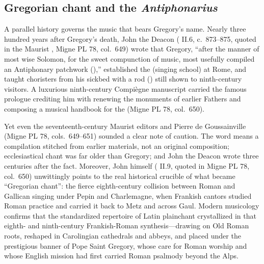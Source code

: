 \subsection{Gregorian chant and the \emph{Antiphonarius}}

A parallel history governs the music that bears Gregory's name. Nearly three
hundred years after Gregory's death, John the Deacon (
II.6, c.\ 873--875, quoted in the Maurist , Migne PL 78, col.\ 649) wrote that Gregory, ``after the manner of
most wise Solomon, for the sweet compunction of music, most usefully compiled
an Antiphonary patchwork (),'' established the
 (singing school) at Rome, and taught choristers from
his sickbed with a rod () still shown to ninth-century
visitors. A luxurious ninth-century Compi\`egne manuscript carried the famous
prologue  crediting him with renewing the monuments of
earlier Fathers and composing a musical handbook for the  (Migne PL 78, col.\ 650).

Yet even the seventeenth-century Maurist editors and Pierre de Goussainville
(Migne PL 78, cols.\ 649--651) sounded a clear note of caution. The word
 means a compilation stitched from earlier materials, not an
original composition; ecclesiastical chant was far older than Gregory; and
John the Deacon wrote three centuries after the fact. Moreover, John himself
( II.9, quoted in Migne PL 78, col.\ 650) unwittingly points to the
real historical crucible of what became ``Gregorian chant'': the fierce
eighth-century collision between Roman and Gallican singing under Pepin and
Charlemagne, when Frankish cantors studied Roman practice and carried it back
to Metz and across Gaul. Modern musicology confirms that the standardized
repertoire of Latin plainchant crystallized in that eighth- and ninth-century
Frankish-Roman synthesis---drawing on Old Roman roots, reshaped in Carolingian
cathedrals and abbeys, and placed under the prestigious banner of Pope Saint
Gregory, whose care for Roman worship and whose English mission had first
carried Roman psalmody beyond the Alps.
